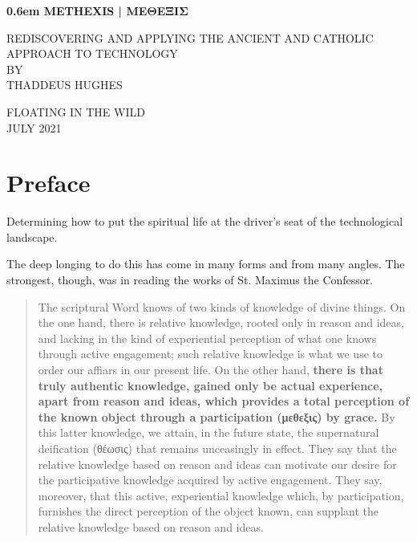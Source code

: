 \documentclass[letterpaper]{article}
\begin{document}
\clearpage
\newcommand\nbvspace[1][3]{\vspace*{\stretch{#1}}}
\newcommand\nbstretchyspace{\spaceskip0.5em plus 0.25em minus 0.25em}
\newcommand{\nbtitlestretch}{\spaceskip0.6em}
\pagestyle{plain}
\begin{center}
  \bfseries
  \nbvspace[1]
  \Huge
  {\nbtitlestretch\huge
    METHEXIS | ΜΕΘΕΞΙΣ}

  \nbvspace[1]
  \normalsize
  REDISCOVERING AND APPLYING THE ANCIENT AND CATHOLIC APPROACH TO TECHNOLOGY\\

  \nbvspace[1]
  \small BY\\
  \Large THADDEUS HUGHES\\

  \nbvspace[2]

  \nbvspace[3]
  \normalsize

  \large
  FLOATING IN THE WILD \\
  \small JULY 2021 \\
\end{center}

\raggedbottom
\tableofcontents

\newpage

\section{Preface}

Determining how to put the spiritual life at the driver's seat of the technological landscape.

The deep longing to do this has come in many forms and from many angles. The strongest, though, was in reading the works of St. Maximus the Confessor.

\begin{quote}
  The scriptural Word knows of two kinds of knowledge of divine things. On the one hand, there is relative knowledge, rooted only in reason and ideas, and lacking in the kind of experiential perception of what one knows through active engagement; such relative knowledge is what we use to order our affiars in our present life. On the other hand, \textbf{there is that truly authentic knowledge, gained only be actual experience, apart from reason and ideas, which provides a total perception of the known object through a participation (μεθεξις) by grace.} By this latter knowledge, we attain, in the future state, the supernatural deification (θέωσις) that remains unceasingly in effect. They say that the relative knowledge based on reason and ideas can motivate our desire for the participative knowledge acquired by active engagement. They say, moreover, that this active, experiential knowledge which, by participation, furnishes the direct perception of the object known, can supplant the relative knowledge based on reason and ideas.
\end{quote}
\end{document}
